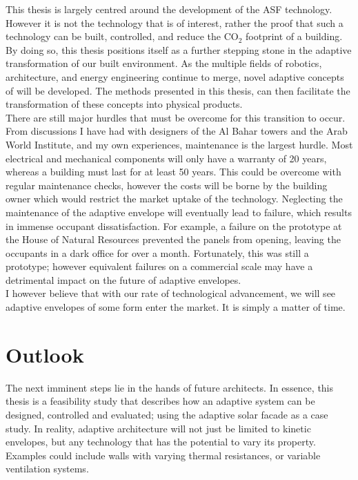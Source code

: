 This thesis is largely centred around the development of the ASF technology. However it is not the technology that is of interest, rather the proof that such a technology can be built, controlled, and reduce the CO$_2$ footprint of a building. By doing so, this thesis positions itself as a further stepping stone in the adaptive transformation of our built environment. As the multiple fields of robotics, architecture, and energy engineering continue to merge, novel adaptive concepts of will be developed. The methods presented in this thesis, can then facilitate the transformation of these concepts into physical products. \\

There are still major hurdles that must be overcome for this transition to occur. From discussions I have had with designers of the Al Bahar towers and the Arab World Institute, and my own experiences, maintenance is the largest hurdle. Most electrical and mechanical components will only have a warranty of 20 years, whereas a building must last for at least 50 years. This could be overcome with regular maintenance checks, however the costs will be borne by the building owner which would restrict the market uptake of the technology. Neglecting the maintenance of the adaptive envelope will eventually lead to failure, which results in immense occupant dissatisfaction. For example, a failure on the prototype at the House of Natural Resources prevented the panels from opening, leaving the occupants in a dark office for over a month. Fortunately, this was still a prototype; however equivalent failures on a commercial scale may have a detrimental impact on the future of adaptive envelopes. \\

I however believe that with our rate of technological advancement, we will see adaptive envelopes of some form enter the market. It is simply a matter of time.




\section{Outlook}
\label{ch:mainoutlook}

The next imminent steps lie in the hands of future architects. In essence, this thesis is a feasibility study that describes how an adaptive system can be designed, controlled and evaluated; using the adaptive solar facade as a case study. In reality, adaptive architecture will not just be limited to kinetic envelopes, but any technology that has the potential to vary its property. Examples could include walls with varying thermal resistances, or variable ventilation systems. 

